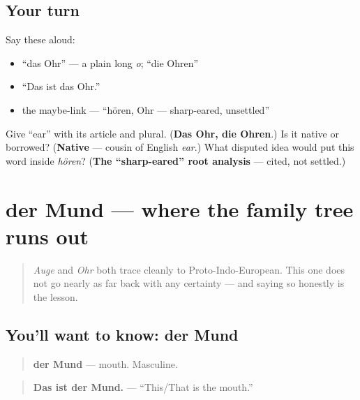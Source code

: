 \subsection*{Your turn}
Say these aloud:

\begin{itemize}
\raggedright
  \item \textquotedblleft{}das Ohr\textquotedblright{} — a plain long \emph{o}; \textquotedblleft{}die Ohren\textquotedblright{}
  \item \textquotedblleft{}Das ist das Ohr.\textquotedblright{}
  \item the maybe-link — \textquotedblleft{}hören, Ohr — sharp-eared, unsettled\textquotedblright{}
\end{itemize}

\begin{tcolorbox}[breakable,colback=teal!4,colframe=teal!35!black,title={Before you move on}]
Give \textquotedblleft{}ear\textquotedblright{} with its article and plural. (\textbf{Das Ohr, die Ohren}.) Is it native or borrowed? (\textbf{Native} — cousin of English \emph{ear}.) What disputed idea would put this word inside \emph{hören}? (\textbf{The \textquotedblleft{}sharp-eared\textquotedblright{} root analysis} — cited, not settled.)
\end{tcolorbox}
\section[der Mund]{der Mund — where the family tree runs out}

\label{lesson:GE-C30-mund}



\begin{quote}
\emph{Auge} and \emph{Ohr} both trace cleanly to Proto-Indo-European. This one does not go nearly as far back with any certainty — and saying so honestly is the lesson.
\end{quote}

\subsection*{You'll want to know: der Mund}
\begin{quote}
\textbf{der Mund} — mouth. Masculine.
\end{quote}

\begin{quote}
\textbf{Das ist der Mund.} — \textquotedblleft{}This/That is the mouth.\textquotedblright{}
\end{quote}

